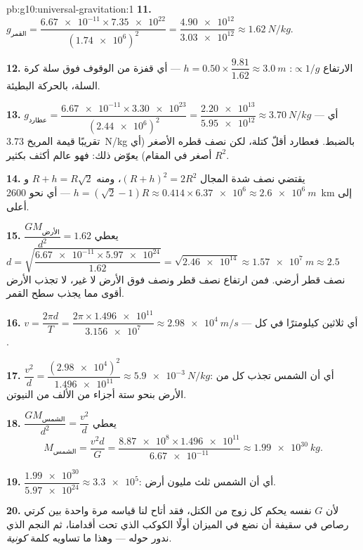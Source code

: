 \begin{solution}{pb:g10:universal-gravitation:1}
\textbf{11.} $g_{\text{القمر}} = \dfrac{\num{6.67e-11} \times
\num{7.35e22}}{(\num{1.74e6})^2} = \dfrac{\num{4.90e12}}
{\num{3.03e12}} \approx \qty{1.62}{N/kg}$.

\textbf{12.} الارتفاع $\propto 1/g$:
$h = 0.50 \times \dfrac{9.81}{1.62} \approx \qty{3.0}{m}$ --- أي
قفزة من الوقوف فوق سلة كرة السلة، بالحركة البطيئة.

\textbf{13.} $g_{\text{عطارد}} = \dfrac{\num{6.67e-11} \times
\num{3.30e23}}{(\num{2.44e6})^2} = \dfrac{\num{2.20e13}}
{\num{5.95e12}} \approx \qty{3.70}{N/kg}$ --- أي تقريبًا قيمة المريخ
\qty{3.73}{N/kg} بالضبط. فعطارد أقلّ كتلة، لكن نصف قطره الأصغر (أي
$R^2$ أصغر في المقام) يعوّض ذلك: فهو عالم أكثف بكثير.

\textbf{14.} يقتضي نصف شدة المجال
$(R + h)^2 = 2 R^2$، ومنه $R + h = R\sqrt{2}$ و
$h = (\sqrt{2} - 1) R \approx 0.414 \times \num{6.37e6}
\approx \qty{2.6e6}{m}$ --- أي نحو \qty{2600}{km} إلى أعلى.

\textbf{15.} $\dfrac{G M_{\text{الأرض}}}{d^2} = 1.62$ يعطي
$d = \sqrt{\dfrac{\num{6.67e-11} \times \num{5.97e24}}{1.62}}
= \sqrt{\num{2.46e14}} \approx \qty{1.57e7}{m} \approx 2.5$ نصف قطر
أرضي. فمن ارتفاع نصف قطر ونصف فوق الأرض لا غير، لا تجذب الأرض
أقوى مما يجذب سطح القمر.

\textbf{16.} $v = \dfrac{2\pi d}{T}
= \dfrac{2\pi \times \num{1.496e11}}{\num{3.156e7}}
\approx \qty{2.98e4}{m/s}$ --- أي ثلاثين كيلومترًا في كل .

\textbf{17.} $\dfrac{v^2}{d} = \dfrac{(\num{2.98e4})^2}{\num{1.496e11}}
\approx \qty{5.9e-3}{N/kg}$: أي أن الشمس تجذب كل  من الأرض
بنحو ستة أجزاء من الألف من النيوتن.

\textbf{18.} $\dfrac{G M_{\text{الشمس}}}{d^2} = \dfrac{v^2}{d}$ يعطي
\[
M_{\text{الشمس}} = \frac{v^2 d}{G}
= \frac{\num{8.87e8} \times \num{1.496e11}}{\num{6.67e-11}}
\approx \qty{1.99e30}{kg}.
\]

\textbf{19.} $\dfrac{\num{1.99e30}}{\num{5.97e24}} \approx
\num{3.3e5}$: أي أن الشمس ثلث مليون أرض.

\textbf{20.} لأن $G$ نفسه يحكم كل زوج من الكتل،
فقد أتاح لنا قياسه مرة واحدة بين كرتي رصاص في سقيفة أن نضع في
الميزان أولًا الكوكب الذي تحت أقدامنا، ثم النجم الذي ندور حوله ---
وهذا ما تساويه كلمة \emph{كونية}.
\end{solution}
